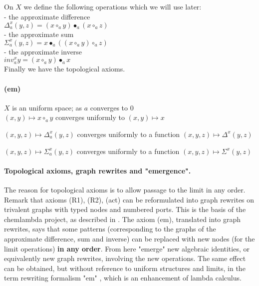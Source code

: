 \documentclass{article}
\begin{document}
\noindent On $X$ we define the following operations which we will use later:\\ 

- the approximate difference \\  

$\Delta^{x}_{a} (y , z)  =  (x \circ_a y) \bullet_a (x \circ_a z) $ \\ 

- the approximate sum \\  

$\Sigma^{x}_{a} (y, z) = x \bullet_{a} ( ( x \circ_{a} y) \circ_{a} z)$  \\ 

- the approximate inverse \\

$inv^{x}_{a} y = (x \circ_{a} y) \bullet_{a} x$ \\

\noindent Finally we have the topological axioms. 


\paragraph{(em)} $X$ is an uniform space; as $a$ converges to $0$ \\

     $ (x,y) \mapsto x \circ_a y$ converges uniformly to  $(x,y) \mapsto x$  

     $(x,y,z) \mapsto \Delta^{x}_{a} (y , z)$ converges uniformly to a function $(x,y,z) \mapsto \Delta^{x} (y , z)$

      $(x,y,z) \mapsto \Sigma^{x}_{a} (y , z)$ converges uniformly to a function $(x,y,z) \mapsto \Sigma^{x} (y , z)$ \\

\paragraph{Topological axioms, graph rewrites and "emergence".} The reason for topological axioms is to allow passage to the limit in any order. Remark that axioms (R1), (R2), (act) can be reformulated into graph rewrites on trivalent graphs with typed nodes and numbered ports. This is the basis of the chemlambda project, as described in \cite{buligahis}.  The axiom (em), translated into graph rewrites, says that some patterns (corresponding to the graphs of the approximate difference, sum and inverse) can be replaced with new nodes (for the limit operations) {\bf in any order}. From here "emerge" new algebraic identities, or equivalently new graph rewrites, involving the new operations. The same effect can be obtained, but without reference to uniform structures and limits, in the term rewriting formalism "em" \cite{buligaem}, which is an enhancement of lambda calculus. \\
\end{document}
